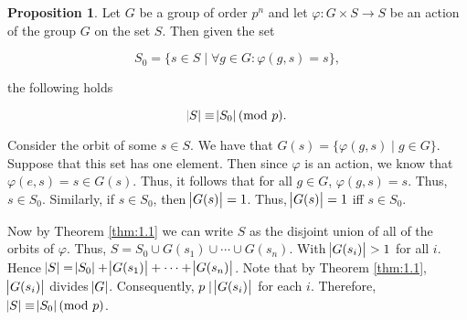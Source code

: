 \documentclass{article}
\makeatletter
\theoremstyle{definition}
\newtheorem{prop}{Proposition}[section]
\theoremstyle{remark}
\let\oldproofname=\proofname
\renewcommand{\proofname}{\bf{\textit{\oldproofname}}}
\theoremstyle{definition}
\renewenvironment{proof}[1][\proofname]{\par
  \pushQED{\qed}%
  \normalfont \topsep6\p@\@plus6\p@\relax
  \list{}{\leftmargin=0mm
          \rightmargin=0mm
          \settowidth{\itemindent}{\itshape#1}%
          \labelwidth=4mm
          \parsep=0pt \listparindent=0mm%
  }
  \item[\hskip\labelsep
        \itshape
    #1\@addpunct{.}]\ignorespaces
}{%
  \popQED\endlist\@endpefalse
}
\makeatother
\begin{document}
    \begin{prop}\label{prop:1.17}
        Let $G$ be a group of order $p^n$ and let $\varphi\colon G\times S\rightarrow S$ be an action of the group $G$ on the set $S$. Then given the set
            
        \begin{equation*}
            S_0=\{s\in S\mid\forall g\in G\colon\varphi(g,s)=s\},
        \end{equation*}
            
        the following holds
            
        \begin{equation*}
            \abs{S}\equiv\abs{S_0}(\text{mod }p).
        \end{equation*}
    \end{prop}
        \begin{proof}
            Consider the orbit of some $s\in S$. We have that $G(s)=\{\varphi(g,s)\mid g\in G\}$. Suppose that this set has one element. Then since $\varphi$ is an action, we know that $\varphi(e,s)=s\in G(s)$. Thus, it follows that for all $g\in G$, $\varphi(g,s)=s$. Thus, $s\in S_0$. Similarly, if $s\in S_0$, then $\abs{G(s)}=1$. Thus, $\abs{G(s)}=1$ iff $s\in S_0$.\par\hspace{4mm} Now by Theorem \ref{thm:1.1} we can write $S$ as the disjoint union of all of the orbits of $\varphi$. Thus, $S=S_0\cup G(s_1)\cup \cdots \cup G(s_n)$. With $\abs{G(s_i)}>1$ for all $i$. Hence $\abs{S}=\abs{S_0}+\abs{G(s_1)}+\cdots+\abs{G(s_n)}$. Note that by Theorem \ref{thm:1.1}, $\abs{G(s_i)}$ divides $\abs{G}$. Consequently, $p\mid\abs{G(s_i)}$ for each $i$. Therefore, $\abs{S}\equiv\abs{S_0}(\text{mod }p)$.
        \end{proof}
            
\end{document}
